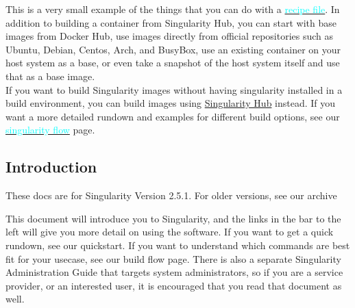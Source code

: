 \documentclass[a4paper]{article}
\begin{document}
This is a very small example of the things that you can do with a \hyperref[sec:recipefile]{{\textcolor{cyan}{recipe file}}}. In addition to building a container from Singularity Hub, you can start with base images from Docker Hub, use images directly from official repositories such as Ubuntu, Debian, Centos, Arch, and BusyBox, use an existing container on your host system as a base, or even take a snapshot of the host system itself and use that as a base image.\\

If you want to build Singularity images without having singularity installed in a build environment, you can build images using \href{https://github.com/singularityhub/singularityhub.github.io/wiki}{Singularity Hub} instead. If you want a more detailed rundown and examples for different build options, see our \hyperref[sec:singularityflow]{{\textcolor{cyan}{singularity flow}}} page.


\subsection{Introduction}

\begin{flushleft} 

\scriptsize{These docs are for Singularity Version 2.5.1. For older versions, see our archive}
\end{flushleft}


This document will introduce you to Singularity, and the links 	in the bar to the left will give you more detail on using the 		software. If you want to get a quick rundown, see our 				quickstart. If you want to understand which commands are best 		fit for your usecase, see our build flow page. There is also a 	separate Singularity Administration Guide that targets system 		administrators, so if you are a service provider, or an 			interested user, it is encouraged that you read that document as well.	
\end{document}
